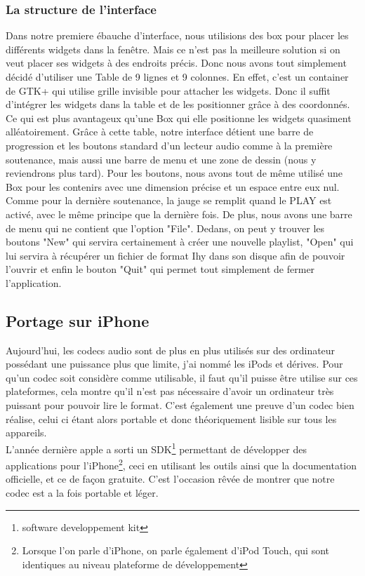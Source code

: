 \documentclass[a4paper,12pt]{article}
\begin{document}
	\subsubsection{La structure de l'interface}
Dans notre premiere ébauche d'interface, nous utilisions des box pour placer les
différents widgets dans la fenêtre. Mais ce n'est pas la meilleure solution si 
on veut placer ses widgets à des endroits précis. Donc nous avons tout simplement 
décidé d'utiliser une Table de 9 lignes et 9 colonnes. En effet, c'est un container 
de GTK+ qui utilise grille invisible pour attacher les widgets. Donc il suffit 
d'intégrer les widgets dans la table et de les positionner grâce à des coordonnés.
Ce qui est plus avantageux qu'une Box qui elle positionne les widgets quasiment 
alléatoirement. Grâce à cette table, notre interface détient une barre de progression 
et les boutons standard d'un lecteur audio comme à la première soutenance, mais aussi 
une barre de menu et une zone de dessin (nous y reviendrons plus tard). Pour les boutons, 
nous avons tout de même utilisé une Box pour les contenirs avec une dimension précise et un 
espace entre eux nul. Comme pour la dernière soutenance, la jauge se remplit quand
le PLAY est activé, avec le même principe que la dernière fois. De plus, nous avons une 
barre de menu qui ne contient que l'option "File". Dedans, on peut y trouver les boutons
"New" qui servira certainement à créer une nouvelle playlist, "Open" qui lui servira à 
récupérer un fichier de format Ihy dans son disque afin de pouvoir l'ouvrir et enfin 
le bouton "Quit" qui permet tout simplement de fermer l'application.  
 
	\subsection{Portage sur iPhone}
Aujourd'hui, les codecs audio sont de plus en plus utilisés sur des
ordinateur possédant une puissance plus que limite, j'ai nommé les iPods
et dérives. Pour qu'un codec soit considère comme utilisable, il faut
qu'il puisse être utilise sur ces plateformes, cela montre qu'il n'est
pas nécessaire d'avoir un ordinateur très puissant pour pouvoir lire le
format. C'est également une preuve d'un codec bien réalise, celui ci
étant alors portable et donc théoriquement lisible sur tous les
appareils.\\
L'année dernière apple a sorti un SDK\footnote{software developpement
kit} permettant de développer des applications pour l'iPhone\footnote{Lorsque
l'on parle d'iPhone, on parle également d'iPod Touch, qui sont identiques au
niveau plateforme de développement}, ceci en
utilisant les outils ainsi que la documentation officielle, et ce de façon gratuite.
C'est l'occasion rêvée de montrer que notre codec est a la fois
portable et léger.\\
\end{document}
